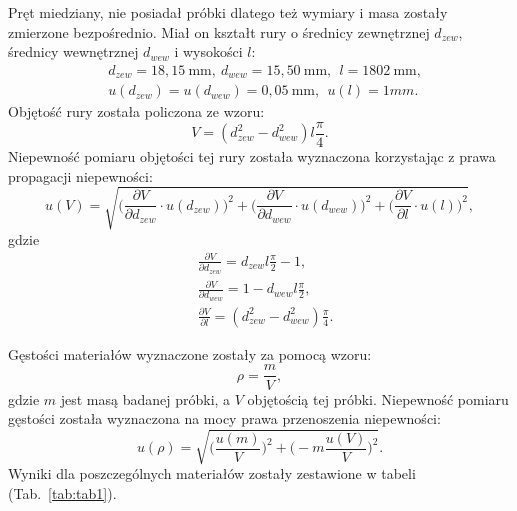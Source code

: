 \documentclass[12pt,a4paper]{article}
\numberwithin{equation}{section}
\begin{document}
Pręt miedziany, nie posiadał próbki dlatego też wymiary i masa zostały zmierzone bezpośrednio. Miał on kształt rury o średnicy zewnętrznej $d_{zew}$, średnicy wewnętrznej $d_{wew}$ i wysokości $l$:
\begin{equation}
	\begin{split}
		&d_{zew} = 18,15~\textrm{mm},~d_{wew} = 15,50~\textrm{mm},~~l = 1802~\textrm{mm},\\
		&u(d_{zew}) = u(d_{wew}) = 0,05~\textrm{mm},~~u(l) = 1mm.
	\end{split}
\end{equation}
Objętość rury została policzona ze wzoru:
\begin{equation}
	V = (d_{zew}^2 - d_{wew}^2) l \frac{\pi }{4}.
\end{equation}
Niepewność pomiaru objętości tej rury została wyznaczona korzystając z prawa propagacji niepewności:
\begin{equation}
	u(V) = \sqrt{\Bigg(\frac{\partial V}{\partial d_{zew}} \cdot u(d_{zew})\Bigg)^2 + \Bigg(\frac{\partial V}{\partial d_{wew}} \cdot u(d_{wew})\Bigg)^2  + \Bigg(\frac{\partial V}{\partial l} \cdot u(l)\Bigg)^2},
\end{equation}
gdzie
\begin{equation}
	\begin{split}
		&\frac{\partial V}{\partial d_{zew}} = d_{zew} l \frac{\pi}{2} - 1,\\[5pt]
		&\frac{\partial V}{\partial d_{wew}} = 1 - d_{wew} l \frac{\pi}{2},\\[5pt]
		&\frac{\partial V}{\partial l} = (d_{zew}^2 - d_{wew}^2) \frac{\pi }{4}.
	\end{split}
\end{equation}

\pagebreak
Gęstości materiałów wyznaczone zostały za pomocą wzoru:
\begin{equation}
	\rho = \frac{m}{V},
\end{equation}
gdzie $m$ jest masą badanej próbki, a $V$ objętością tej próbki.
Niepewność pomiaru gęstości została wyznaczona na mocy prawa przenoszenia niepewności:
\begin{equation}
	u(\rho) = \sqrt{\Bigg(\frac{u(m)}{V}\Bigg)^2 + \Bigg(-m \frac{u(V)}{V}\Bigg)^2}.
\end{equation}
Wyniki dla poszczególnych materiałów zostały zestawione w tabeli \mbox{(Tab. \ref{tab:tab1})}.
\end{document}
